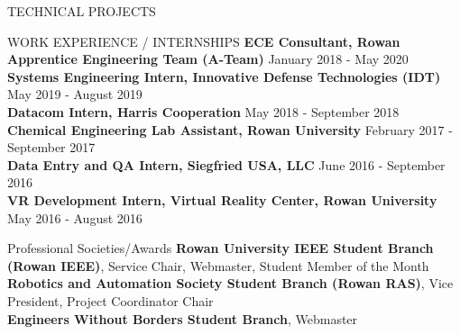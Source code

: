 \documentclass{resume} %
\begin{document}
\begin{rSection}{TECHNICAL PROJECTS}


\end{rSection}



\begin{rSection}{WORK EXPERIENCE / INTERNSHIPS} \itemsep -3pt
  \textbf{ECE Consultant, Rowan Apprentice Engineering Team (A-Team)} \hfill January 2018 - May 2020\\
  \textbf{Systems Engineering Intern, Innovative Defense Technologies (IDT)} \hfill May 2019 - August 2019\\
  \textbf{Datacom Intern, Harris Cooperation} \hfill May 2018 - September 2018\\
  \textbf{Chemical Engineering Lab Assistant, Rowan University} \hfill February 2017 - September 2017\\
  \textbf{Data Entry and QA Intern, Siegfried USA, LLC} \hfill June 2016 - September 2016\\
  \textbf{VR Development Intern, Virtual Reality Center, Rowan University} \hfill May 2016 - August 2016
\end{rSection}

\begin{rSection}{Professional Societies/Awards} \itemsep -3pt
  {\textbf{Rowan University IEEE Student Branch (Rowan IEEE)}, Service Chair,
  Webmaster, Student Member of the Month}\\
  {\textbf{Robotics and Automation Society Student Branch (Rowan RAS)}, Vice President, Project Coordinator Chair}\\
  {\textbf{Engineers Without Borders Student Branch}, Webmaster}
\end{rSection}
\end{document}
